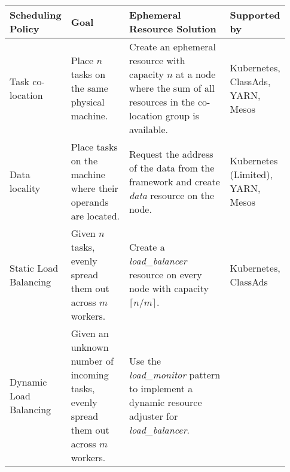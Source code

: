 \begin{table*}[t]
  \centering
  \begin{xtabular}{|p{0.12\linewidth}|p{0.24\linewidth}|p{0.45\linewidth}|p{0.12\linewidth}|}
  \hline
    \textbf{Scheduling Policy} & \textbf{Goal} & \textbf{Ephemeral Resource Solution} & \textbf{Supported by}\\
  \hline
  
  
  Task co-location & 
  Place $n$ tasks on the same physical machine. &
  Create an ephemeral resource with capacity $n$ at a node where the sum of all resources in the co-location group is available.
    &
  Kubernetes, ClassAds, YARN, Mesos
  \\
  \hline
  
  Data locality & 
  Place tasks on the machine where their operands are located. &
  Request the address of the data from the framework and create \textit{data} resource on the node. 
    &
  Kubernetes (Limited), YARN, Mesos
  \\
  \hline
  
  Static Load Balancing & 
  Given $n$ tasks, evenly spread them out across $m$ workers. &
  Create a \textit{load\_balancer} resource on every node with capacity $\lceil n/m \rceil$.
    &
  Kubernetes, ClassAds
  \\
  \hline
  
  Dynamic Load Balancing & 
  Given an unknown number of incoming tasks, evenly spread them out across $m$ workers. &
  Use the \textit{load\_monitor} pattern to implement a dynamic resource adjuster for \textit{load\_balancer}. 


\end{xtabular}
\end{table*}
